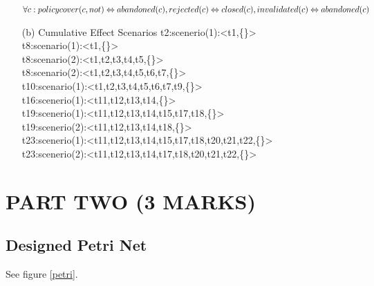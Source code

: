 \documentclass[runningheads]{llncs}
\begin{document}
\begin{itemize}
$\forall c: policycover(c, not) \Leftrightarrow abandoned(c), \\ rejected(c) \Leftrightarrow closed(c), \\ invalidated(c) \Leftrightarrow abandoned(c) $
\\



\item[(b)]{Cumulative Effect Scenarios}
t2:scenerio(1):<t1,\{<t2>\}>\\
t8:scenario(1):<t1,\{<t8>\}>\\
t8:scenario(2):<t1,t2,t3,t4,t5,\{<t8>\}> \\
t8:scenario(2):<t1,t2,t3,t4,t5,t6,t7,\{<t8>\}> \\          
t10:scenario(1):<t1,t2,t3,t4,t5,t6,t7,t9,\{<t10>\}>\\
t16:scenerio(1):<t11,t12,t13,t14,\{<t16>\}>    \\
t19:scenerio(1):<t11,t12,t13,t14,t15,t17,t18,\{<t19>\}>\\
t19:scenerio(2):<t11,t12,t13,t14,t18,\{<t19>\}> \\
t23:scenerio(1):<t11,t12,t13,t14,t15,t17,t18,t20,{t21,t22},\{<t23>\}>\\
t23:scenerio(2):<t11,t12,t13,t14,t17,t18,t20,{t21,t22},\{<t23>\}>\\           

\end{itemize}

\section{PART TWO (3 MARKS)}
\subsection{Designed Petri Net}

See figure \ref{petri}.
\end{document}
